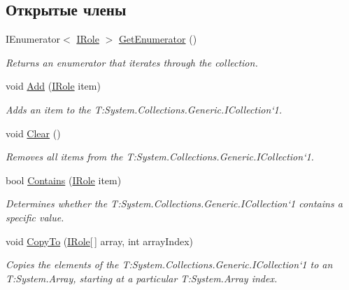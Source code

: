 \subsection*{Открытые члены}
\begin{DoxyCompactItemize}
\item 
I\+Enumerator$<$ \hyperlink{interface_security_1_1_interfaces_1_1_model_1_1_i_role}{I\+Role} $>$ \hyperlink{class_security_1_1_entity_framework_1_1_collections_1_1_role_collection_a254b24307d0ef04c17517e8175841c80}{Get\+Enumerator} ()
\begin{DoxyCompactList}\small\item\em Returns an enumerator that iterates through the collection. \end{DoxyCompactList}\item 
void \hyperlink{class_security_1_1_entity_framework_1_1_collections_1_1_role_collection_a98cfc96d025928a994b2a6763a803982}{Add} (\hyperlink{interface_security_1_1_interfaces_1_1_model_1_1_i_role}{I\+Role} item)
\begin{DoxyCompactList}\small\item\em Adds an item to the T\+:\+System.\+Collections.\+Generic.\+I\+Collection`1. \end{DoxyCompactList}\item 
void \hyperlink{class_security_1_1_entity_framework_1_1_collections_1_1_role_collection_aad5de7562acf3e6b8b44ea8ce6eac19b}{Clear} ()
\begin{DoxyCompactList}\small\item\em Removes all items from the T\+:\+System.\+Collections.\+Generic.\+I\+Collection`1. \end{DoxyCompactList}\item 
bool \hyperlink{class_security_1_1_entity_framework_1_1_collections_1_1_role_collection_af4f03ba2754a9a7a1c56cf2d86e4396a}{Contains} (\hyperlink{interface_security_1_1_interfaces_1_1_model_1_1_i_role}{I\+Role} item)
\begin{DoxyCompactList}\small\item\em Determines whether the T\+:\+System.\+Collections.\+Generic.\+I\+Collection`1 contains a specific value. \end{DoxyCompactList}\item 
void \hyperlink{class_security_1_1_entity_framework_1_1_collections_1_1_role_collection_ae2b225130ca92d4a64f81b8fc164bfda}{Copy\+To} (\hyperlink{interface_security_1_1_interfaces_1_1_model_1_1_i_role}{I\+Role}\mbox{[}$\,$\mbox{]} array, int array\+Index)
\begin{DoxyCompactList}\small\item\em Copies the elements of the T\+:\+System.\+Collections.\+Generic.\+I\+Collection`1 to an T\+:\+System.\+Array, starting at a particular T\+:\+System.\+Array index. \end{DoxyCompactList}\item 

\end{DoxyCompactItemize}
